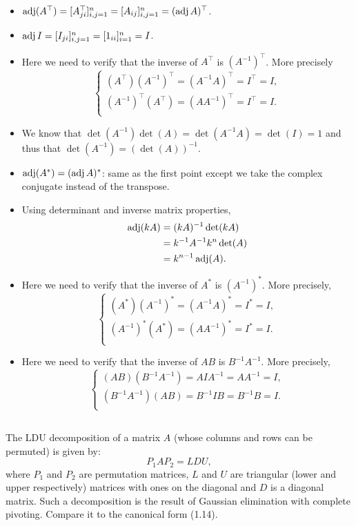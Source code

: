 \begin{solution}
  \begin{itemize}
    \item $\operatorname{adj}(A^\top) = [A_{ji}^\top]_{i,j=1}^n = [A_{ij}]_{i,j=1}^n = (\operatorname{adj} A)^\top$.
    \item $\operatorname{adj} I = [I_{ji}]_{i,j=1}^n = [1_{ii}]_{i=1}^n = I$.
    \item Here we need to verify that the inverse of $A^\top$ is $(A^{-1})^\top$.
    More precisely
    \[
      \left\{ \begin{array}{l}
         (A^\top)(A^{-1})^\top = (A^{-1}A)^\top = I^\top = I,\\
         (A^{-1})^\top (A^\top) = (A A^{-1})^\top = I^\top = I.\\
      \end{array}\right.
    \]
    \item We know that $\det(A^{-1}) \det(A) = \det(A^{-1}A) = \det(I) = 1$
    and thus that $\det(A^{-1}) = (\det(A))^{-1}$.
    \item $\operatorname{adj}(A^*) = (\operatorname{adj} A)^*$: same as the first point except we take the
    complex conjugate instead of the transpose.
    \item Using determinant and inverse matrix properties,
    \begin{align*}
      \operatorname{adj}(kA) &= (kA)^{-1} \det(kA) \\
      &= k^{-1} A^{-1} k^n \det(A) \\
      &= k^{n-1} \operatorname{adj}(A).
    \end{align*}
    \item Here we need to verify that the inverse of $A^*$ is $(A^{-1})^*$.
    More precisely,
    \[
      \left\{ \begin{array}{l}
         (A^*)(A^{-1})^* = (A^{-1}A)^* = I^* = I,\\
         (A^{-1})^* (A^*) = (A A^{-1})^* = I^* = I.\\
      \end{array}\right.
    \]
    \item Here we need to verify that the inverse of $AB$ is $B^{-1}A^{-1}$.
    More precisely,
    \[
      \left\{ \begin{array}{l}
         (AB) (B^{-1}A^{-1}) = A I A^{-1} = A A^{-1} = I, \\
         (B^{-1}A^{-1}) (AB) = B^{-1} I B = B^{-1} B = I. \\
      \end{array}\right.
    \]
  \end{itemize}
\end{solution}

\subsection{}
The LDU decomposition of a matrix \(A\) (whose columns and rows can be permuted) is given by:
\[
P_1 A P_2 = LDU,
\]
where \(P_1\) and \(P_2\) are permutation matrices, \(L\) and \(U\) are triangular (lower and upper respectively) matrices with ones on the diagonal and \(D\) is a diagonal matrix.
Such a decomposition is the result of Gaussian elimination with complete pivoting.
Compare it to the canonical form (1.14).

\nosolution
